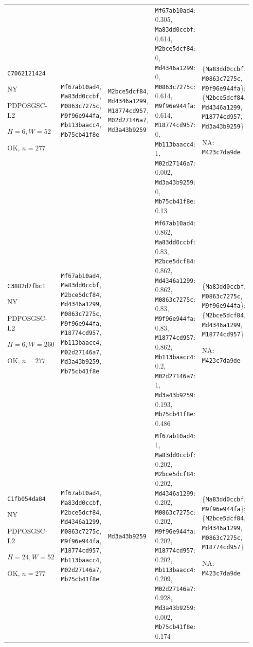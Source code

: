 \begin{longtable}{p{.15\linewidth}p{.17\linewidth}p{.17\linewidth}p{.25\linewidth}p{.14\linewidth}}
\texttt{C7062121424}\par NY\par PDPOSGSC-\allowbreak{}L2\par $H=6,W=52$\par OK, $n=277$ & \texttt{Mf67ab10ad4}, \texttt{Ma83dd0ccbf}, \texttt{M0863c7275c}, \texttt{M9f96e944fa}, \texttt{Mb113baacc4}, \texttt{Mb75cb41f8e} & \texttt{M2bce5dcf84}, \texttt{Md4346a1299}, \texttt{M18774cd957}, \texttt{M02d27146a7}, \texttt{Md3a43b9259} & \texttt{Mf67ab10ad4}: 0.305, \texttt{Ma83dd0ccbf}: 0.614, \texttt{M2bce5dcf84}: 0, \texttt{Md4346a1299}: 0, \texttt{M0863c7275c}: 0.614, \texttt{M9f96e944fa}: 0.614, \texttt{M18774cd957}: 0, \texttt{Mb113baacc4}: 1, \texttt{M02d27146a7}: 0.002, \texttt{Md3a43b9259}: 0, \texttt{Mb75cb41f8e}: 0.13 & \{\texttt{Ma83dd0ccbf}, \texttt{M0863c7275c}, \texttt{M9f96e944fa}\}; \{\texttt{M2bce5dcf84}, \texttt{Md4346a1299}, \texttt{M18774cd957}, \texttt{Md3a43b9259}\}\par NA: \texttt{M423c7da9de} \\
\texttt{C3882d7fbc1}\par NY\par PDPOSGSC-\allowbreak{}L2\par $H=6,W=260$\par OK, $n=277$ & \texttt{Mf67ab10ad4}, \texttt{Ma83dd0ccbf}, \texttt{M2bce5dcf84}, \texttt{Md4346a1299}, \texttt{M0863c7275c}, \texttt{M9f96e944fa}, \texttt{M18774cd957}, \texttt{Mb113baacc4}, \texttt{M02d27146a7}, \texttt{Md3a43b9259}, \texttt{Mb75cb41f8e} & --- & \texttt{Mf67ab10ad4}: 0.862, \texttt{Ma83dd0ccbf}: 0.83, \texttt{M2bce5dcf84}: 0.862, \texttt{Md4346a1299}: 0.862, \texttt{M0863c7275c}: 0.83, \texttt{M9f96e944fa}: 0.83, \texttt{M18774cd957}: 0.862, \texttt{Mb113baacc4}: 0.2, \texttt{M02d27146a7}: 1, \texttt{Md3a43b9259}: 0.193, \texttt{Mb75cb41f8e}: 0.486 & \{\texttt{Ma83dd0ccbf}, \texttt{M0863c7275c}, \texttt{M9f96e944fa}\}; \{\texttt{M2bce5dcf84}, \texttt{Md4346a1299}, \texttt{M18774cd957}\}\par NA: \texttt{M423c7da9de} \\
\texttt{C1fb054da84}\par NY\par PDPOSGSC-\allowbreak{}L2\par $H=24,W=52$\par OK, $n=277$ & \texttt{Mf67ab10ad4}, \texttt{Ma83dd0ccbf}, \texttt{M2bce5dcf84}, \texttt{Md4346a1299}, \texttt{M0863c7275c}, \texttt{M9f96e944fa}, \texttt{M18774cd957}, \texttt{Mb113baacc4}, \texttt{M02d27146a7}, \texttt{Mb75cb41f8e} & \texttt{Md3a43b9259} & \texttt{Mf67ab10ad4}: 1, \texttt{Ma83dd0ccbf}: 0.202, \texttt{M2bce5dcf84}: 0.202, \texttt{Md4346a1299}: 0.202, \texttt{M0863c7275c}: 0.202, \texttt{M9f96e944fa}: 0.202, \texttt{M18774cd957}: 0.202, \texttt{Mb113baacc4}: 0.209, \texttt{M02d27146a7}: 0.928, \texttt{Md3a43b9259}: 0.002, \texttt{Mb75cb41f8e}: 0.174 & \{\texttt{Ma83dd0ccbf}, \texttt{M9f96e944fa}\}; \{\texttt{M2bce5dcf84}, \texttt{Md4346a1299}, \texttt{M0863c7275c}, \texttt{M18774cd957}\}\par NA: \texttt{M423c7da9de} \\

\end{longtable}
